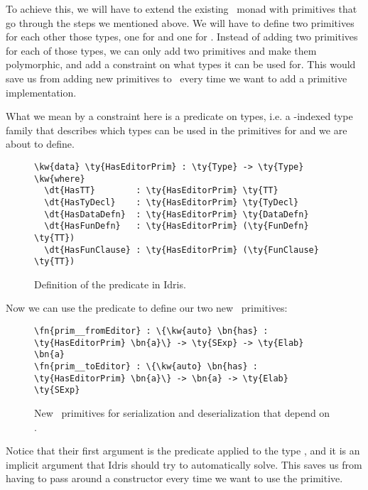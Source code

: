 To achieve this, we will have to extend the existing \Elab\ monad with
primitives that go through the steps we mentioned above. We will have to define
two primitives for each other those types, one for  and one for
. Instead of adding two primitives for each of those types, we can
only add two primitives and make them polymorphic, and add a constraint on what
types it can be used for. This would save us from adding new primitives to
\Elab\ every time we want to add a primitive  implementation.

What we mean by a constraint here is a predicate on types,
i.e. a -indexed type family that describes which types can be used in
the primitives for  and  we are about to define.

\begin{figure}[ht]
\caption{Definition of the  predicate in Idris.}
\begin{Verbatim}[framesep=2mm, label=\footnotesize{\normalfont{Idris}}, labelposition=topline]
\kw{data} \ty{HasEditorPrim} : \ty{Type} -> \ty{Type} \kw{where}
  \dt{HasTT}        : \ty{HasEditorPrim} \ty{TT}
  \dt{HasTyDecl}    : \ty{HasEditorPrim} \ty{TyDecl}
  \dt{HasDataDefn}  : \ty{HasEditorPrim} \ty{DataDefn}
  \dt{HasFunDefn}   : \ty{HasEditorPrim} (\ty{FunDefn} \ty{TT})
  \dt{HasFunClause} : \ty{HasEditorPrim} (\ty{FunClause} \ty{TT})
\end{Verbatim}
\end{figure}

Now we can use the predicate  to define our two new
\Elab\ primitives:

\begin{figure}[ht]
\caption{New \Elab\ primitives for serialization and deserialization that depend on .}
\label{code:newElabPrims}
\begin{Verbatim}[framesep=2mm, label=\footnotesize{\normalfont{Idris}}, labelposition=topline]
\fn{prim__fromEditor} : \{\kw{auto} \bn{has} : \ty{HasEditorPrim} \bn{a}\} -> \ty{SExp} -> \ty{Elab} \bn{a}
\fn{prim__toEditor} : \{\kw{auto} \bn{has} : \ty{HasEditorPrim} \bn{a}\} -> \bn{a} -> \ty{Elab} \ty{SExp}
\end{Verbatim}
\end{figure}

Notice that their first argument is the predicate  applied to
the type , and it is an implicit argument that Idris should try to
automatically solve. This saves us from having to pass around a constructor
every time we want to use the primitive.

